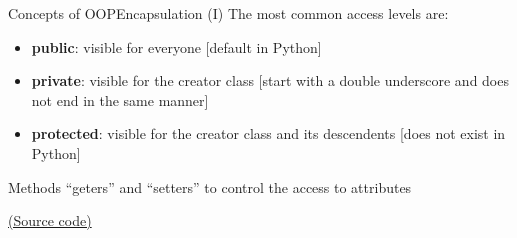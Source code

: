 \documentclass[10pt,compress]{beamer} %
\begin{document}
\begin{frame}{Concepts of OOP}{Encapsulation (I)}
    The most common access levels are:
	
	\begin{itemize}
		\item \textbf{public}: visible for everyone  [default in Python]
		\item \textbf{private}: visible for the creator class [start with a double underscore and does not end in the same manner]
		\item \textbf{protected}: visible for the creator class and its descendents \alert{[does not exist in Python]}
	\end{itemize}

     Methods ``geters'' and ``setters'' to control the access to attributes
\end{frame}

\begin{frame}[plain]%
	\begin{exampleblock}{}
	\vspace{-0.3cm} 
		
	\end{exampleblock}

	\href{https://gist.github.com/dfbarrero/a6ebc6632fb9fe06a2c8c6a47a465ab5}{(Source code)}
\end{frame}
\end{document}
